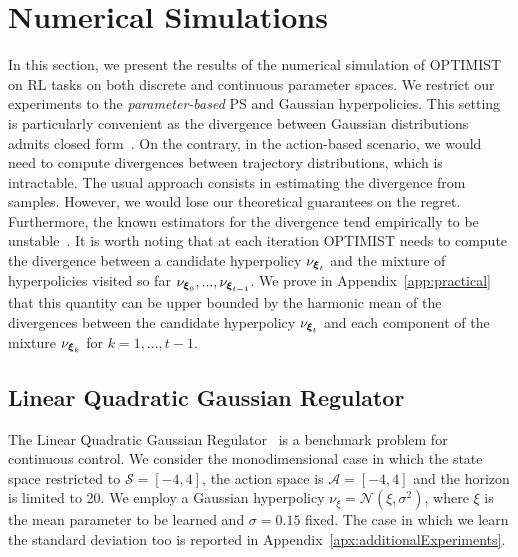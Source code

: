 \documentclass{article}
\makeatletter
\DeclareRobustCommand{\algoname}{OPTIMIST\@\xspace}
\makeatother
\begin{document}
%

\section{Numerical Simulations}\label{sec:exp}
In this section, we present the results of the numerical simulation of \algoname on RL tasks
on both discrete and continuous parameter spaces. We restrict our experiments to the \emph{parameter-based} PS and Gaussian hyperpolicies. This setting is particularly convenient as the \Renyi divergence between Gaussian distributions admits closed form~\cite{gil2013renyi}. On the contrary, in the action-based scenario, 
we would need to compute divergences between trajectory distributions, which is intractable. The usual approach consists in estimating the \Renyi divergence from samples. However, we would lose our theoretical guarantees on the regret. Furthermore, the known estimators for the \Renyi divergence tend empirically to be unstable~\cite{metelli2018policy}. It is worth noting that at each iteration \algoname needs to compute the \Renyi divergence between a candidate hyperpolicy $\nu_{\boldsymbol{\xi}_t}$ and the mixture of hyperpolicies visited so far $\nu_{\boldsymbol{\xi}_0}, ..., \nu_{\boldsymbol{\xi}_{t-1}}$. We prove in Appendix~\ref{app:practical} that this quantity can be upper bounded by the harmonic mean of the divergences between the candidate hyperpolicy $\nu_{\boldsymbol{\xi}_t}$ and each component of the mixture $\nu_{\boldsymbol{\xi}_{k}}$ for $k=1,...,t-1$. 

\subsection{Linear Quadratic Gaussian Regulator}
The Linear Quadratic Gaussian Regulator~\citep[LQG,][]{dorato1995linear} is a benchmark problem
for continuous control. We consider the monodimensional case in which the state space restricted to $\mathcal{S}=[-4,4]$, the action space is $\mathcal{A}=[-4,4]$ and the horizon is limited to 20. We employ a Gaussian hyperpolicy $\nu_{\xi} = \mathcal{N}( \xi, \sigma^2)$, where $\xi$ is the mean parameter to be learned and $\sigma=0.15$ fixed. The case in which we learn the standard deviation too is reported in Appendix~\ref{apx:additionalExperiments}.
\end{document}
